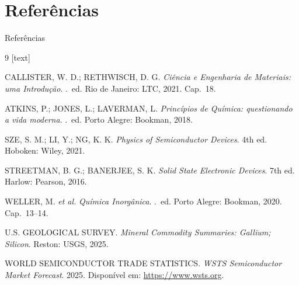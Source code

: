 \section*{Referências}

\begin{frame}[shrink=15]{Referências}
  \begin{thebibliography}{9}
    [text]

    CALLISTER, W. D.; RETHWISCH, D. G.
    \newblock \emph{Ciência e Engenharia de Materiais: uma Introdução}.
    .~ed. Rio de Janeiro: LTC, 2021. Cap.~18.

    ATKINS, P.; JONES, L.; LAVERMAN, L.
    \newblock \emph{Princípios de Química: questionando a vida moderna}.
    .~ed. Porto Alegre: Bookman, 2018.

    SZE, S. M.; LI, Y.; NG, K. K.
    \newblock \emph{Physics of Semiconductor Devices}.
    \newblock 4th ed. Hoboken: Wiley, 2021.

    STREETMAN, B. G.; BANERJEE, S. K.
    \newblock \emph{Solid State Electronic Devices}.
    \newblock 7th ed. Harlow: Pearson, 2016.

    WELLER, M. \emph{et al.}
    \newblock \emph{Química Inorgânica}.
    .~ed. Porto Alegre: Bookman, 2020. Cap.~13--14.

    U.S. GEOLOGICAL SURVEY.
    \newblock \emph{Mineral Commodity Summaries: Gallium; Silicon}.
    \newblock Reston: USGS, 2025.

    WORLD SEMICONDUCTOR TRADE STATISTICS.
    \newblock \emph{WSTS Semiconductor Market Forecast}. 2025.
    \newblock Disponível em: \url{https://www.wsts.org}.
  \end{thebibliography}
\end{frame}

